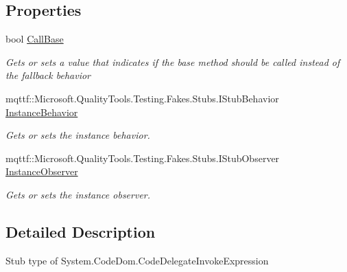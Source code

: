 \subsection*{Properties}
\begin{DoxyCompactItemize}
\item 
bool \hyperlink{class_system_1_1_code_dom_1_1_fakes_1_1_stub_code_delegate_invoke_expression_a49a1ec1c00a6dd7ecd9c235106ef2219}{Call\-Base}
\begin{DoxyCompactList}\small\item\em Gets or sets a value that indicates if the base method should be called instead of the fallback behavior\end{DoxyCompactList}\item 
mqttf\-::\-Microsoft.\-Quality\-Tools.\-Testing.\-Fakes.\-Stubs.\-I\-Stub\-Behavior \hyperlink{class_system_1_1_code_dom_1_1_fakes_1_1_stub_code_delegate_invoke_expression_a019511673e628634ae804a0c355a8e4a}{Instance\-Behavior}
\begin{DoxyCompactList}\small\item\em Gets or sets the instance behavior.\end{DoxyCompactList}\item 
mqttf\-::\-Microsoft.\-Quality\-Tools.\-Testing.\-Fakes.\-Stubs.\-I\-Stub\-Observer \hyperlink{class_system_1_1_code_dom_1_1_fakes_1_1_stub_code_delegate_invoke_expression_a5ccf8383304af6d87633450dc3ebd582}{Instance\-Observer}
\begin{DoxyCompactList}\small\item\em Gets or sets the instance observer.\end{DoxyCompactList}\end{DoxyCompactItemize}


\subsection{Detailed Description}
Stub type of System.\-Code\-Dom.\-Code\-Delegate\-Invoke\-Expression



